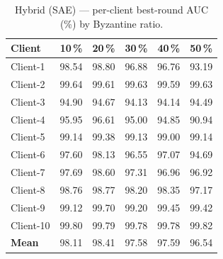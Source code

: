 \documentclass[11pt,a4paper]{article}
\begin{document}
\begin{table}[h]
\centering
\caption{Hybrid (SAE) --- per-client best-round AUC (\%) by Byzantine ratio.}
\label{tab:hybrid_perclient_all}
\begin{tabular}{l rrrrr}
\toprule
\textbf{Client} & \textbf{10\,\%} & \textbf{20\,\%} & \textbf{30\,\%} & \textbf{40\,\%} & \textbf{50\,\%} \\
\midrule
Client-1   & 98.54 & 98.80 & 96.88 & 96.76 & 93.19 \\
Client-2   & 99.64 & 99.61 & 99.63 & 99.59 & 99.63 \\
Client-3   & 94.90 & 94.67 & 94.13 & 94.14 & 94.49 \\
Client-4   & 95.95 & 96.61 & 95.00 & 94.85 & 90.94 \\
Client-5   & 99.14 & 99.38 & 99.13 & 99.00 & 99.14 \\
Client-6   & 97.60 & 98.13 & 96.55 & 97.07 & 94.69 \\
Client-7   & 97.69 & 98.60 & 97.31 & 96.96 & 96.92 \\
Client-8   & 98.76 & 98.77 & 98.20 & 98.35 & 97.17 \\
Client-9   & 99.12 & 99.70 & 99.20 & 99.45 & 99.42 \\
Client-10  & 99.80 & 99.79 & 99.78 & 99.78 & 99.82 \\
\midrule
\textbf{Mean} & 98.11 & 98.41 & 97.58 & 97.59 & 96.54 \\
\bottomrule
\end{tabular}
\end{table}
\end{document}
